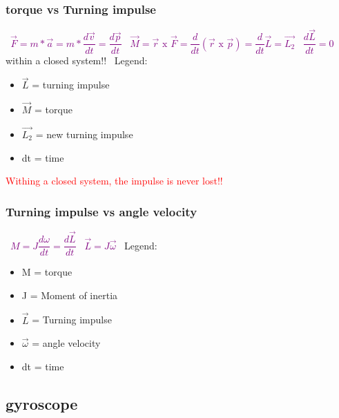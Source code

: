 \documentclass[main.tex,fontsize=8pt,paper=a4,paper=portrait,DIV=calc,]{scrartcl}
\begin{document}
\begin{multicols*}{2}
\subsubsection{torque vs Turning impulse}
\, \newline
\large \textcolor{purple}{\( \vec{F} = m * \vec{a} = m * \dfrac{d\vec{v}}{dt}  = \dfrac{d\vec{p}}{dt}\)}\newline
\, \newline
\large \textcolor{purple}{\( \vec{M} = \vec{r} \text{ x } \vec{F} = \dfrac{d}{dt} (\vec{r} \text{ x } \vec{p}) = \dfrac{d}{dt} \vec{L} = \vec{L_2} \)}\newline
\, \newline
\large \textcolor{purple}{\( \dfrac{d\vec{L}}{dt} = 0 \)} within a closed system!!\newline
\, \newline
\normalsize Legend: \newline
\begin{itemize}
  \item \(\vec{L}\) = turning impulse
  \item \(\vec{M}\) = torque
  \item \(\vec{L_2}\) = new turning impulse  
\item dt = time
\end{itemize}
\textcolor{red}{Withing a closed system, the impulse is never lost!!}

\subsubsection{Turning impulse vs angle velocity}
\, \newline
\large \textcolor{purple}{\( M = J\dfrac{d\omega}{dt} = \dfrac{d\vec{L}}{dt} \)}\newline
\, \newline
\large \textcolor{purple}{\( \vec{L} = J \vec{\omega} \)}
\, \newline
\normalsize Legend: \newline
\begin{itemize}
\item M = torque
\item J = Moment of inertia
\item \(\vec{L}\) = Turning impulse 
\item \(\vec{\omega}\) = angle velocity
\item dt = time
\end{itemize} 

\subsection{gyroscope}

\end{multicols*}
\end{document}

